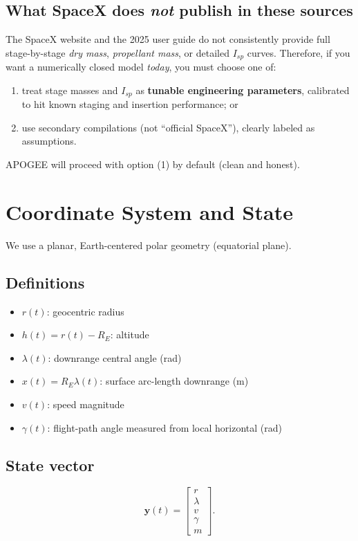 \documentclass[11pt]{article}
\begin{document}
\subsection{What SpaceX does \emph{not} publish in these sources}
The SpaceX website and the 2025 user guide do not consistently provide full stage-by-stage \emph{dry mass}, \emph{propellant mass}, or detailed $I_{sp}$ curves. Therefore, if you want a numerically closed model \emph{today}, you must choose one of:
\begin{enumerate}
\item treat stage masses and $I_{sp}$ as \textbf{tunable engineering parameters}, calibrated to hit known staging and insertion performance; or
\item use secondary compilations (not ``official SpaceX''), clearly labeled as assumptions.
\end{enumerate}
APOGEE will proceed with option (1) by default (clean and honest).

\section{Coordinate System and State}
We use a planar, Earth-centered polar geometry (equatorial plane).

\subsection{Definitions}
\begin{itemize}
\item $r(t)$: geocentric radius
\item $h(t)=r(t)-R_E$: altitude
\item $\lambda(t)$: downrange central angle (rad)
\item $x(t)=R_E\lambda(t)$: surface arc-length downrange (m)
\item $v(t)$: speed magnitude
\item $\gamma(t)$: flight-path angle measured from local horizontal (rad)
\end{itemize}

\subsection{State vector}
\begin{equation}
\boxed{\bm{y}(t)=\begin{bmatrix} r \\ \lambda \\ v \\ \gamma \\ m \end{bmatrix}.}
\end{equation}
\end{document}
